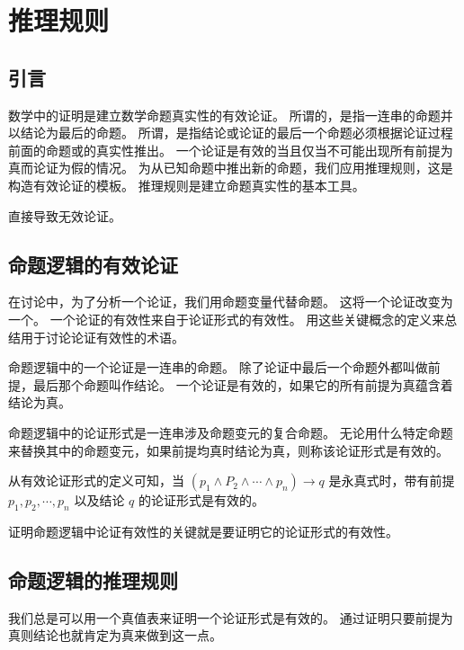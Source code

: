 
\section{推理规则}
{
    \subsection{引言}
    {
        数学中的证明是建立数学命题真实性的有效论证。
        所谓的，是指一连串的命题并以结论为最后的命题。
        所谓，是指结论或论证的最后一个命题必须根据论证过程前面的命题或的真实性推出。
        一个论证是有效的当且仅当不可能出现所有前提为真而论证为假的情况。
        为从已知命题中推出新的命题，我们应用推理规则，这是构造有效论证的模板。
        推理规则是建立命题真实性的基本工具。

        直接导致无效论证。
    }

    \subsection{命题逻辑的有效论证}
    {
        在讨论中，为了分析一个论证，我们用命题变量代替命题。
        这将一个论证改变为一个。
        一个论证的有效性来自于论证形式的有效性。
        用这些关键概念的定义来总结用于讨论论证有效性的术语。

        \begin{defines}
            命题逻辑中的一个论证是一连串的命题。
            除了论证中最后一个命题外都叫做前提，最后那个命题叫作结论。
            一个论证是有效的，如果它的所有前提为真蕴含着结论为真。

            命题逻辑中的论证形式是一连串涉及命题变元的复合命题。
            无论用什么特定命题来替换其中的命题变元，如果前提均真时结论为真，则称该论证形式是有效的。
        \end{defines}

        从有效论证形式的定义可知，当 $(p_1 \wedge P_2 \wedge \cdots \wedge p_n) \rightarrow q$ 是永真式时，带有前提 $p_1, p_2, \cdots , p_n$ 以及结论 $q$ 的论证形式是有效的。

        证明命题逻辑中论证有效性的关键就是要证明它的论证形式的有效性。
    }

    \subsection{命题逻辑的推理规则}
    {
        我们总是可以用一个真值表来证明一个论证形式是有效的。
        通过证明只要前提为真则结论也就肯定为真来做到这一点。

}}
